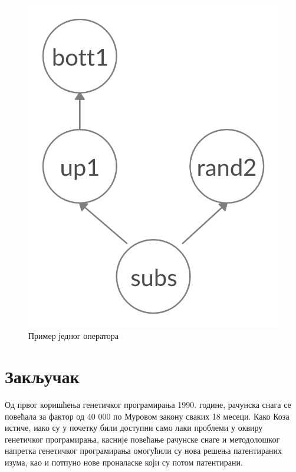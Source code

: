 \documentclass[a4paper]{article}
\begin{document}
\begin{figure}[ht!]
    \begin{center}
        \includegraphics[scale=0.12]{mgp_primer.png}
    \end{center}
    \caption{Пример једног оператора}
    \label{fig:mgp_primer}
\end{figure}

\section{Закључак}

Од првог коришћења генетичког програмирања 1990. године, рачунска снага се повећала за фактор од 40 000 по Муровом закону сваких 18 месеци. Како Коза истиче, иако су у почетку били доступни само лаки проблеми у оквиру генетичког програмирања, касније повећање рачунске снаге и методолошког напретка генетичког програмирања омогућили су нова решења патентираних изума, као и потпуно нове проналаске који су потом патентирани.
\end{document}
